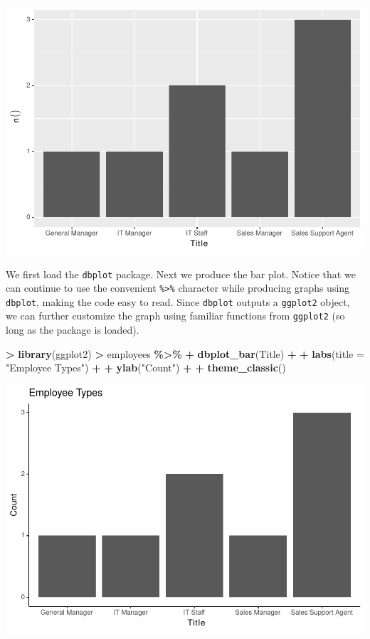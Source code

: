 \documentclass[
]{krantz}
\makeatletter
\newenvironment{Shaded}{\begin{snugshade}}{\end{snugshade}}
\newcommand{\DataTypeTok}[1]{\textcolor[rgb]{0.27,0.27,0.27}{#1}}
\newcommand{\KeywordTok}[1]{\textcolor[rgb]{0.27,0.27,0.27}{\textbf{#1}}}
\newcommand{\NormalTok}[1]{#1}
\newcommand{\OperatorTok}[1]{\textcolor[rgb]{0.43,0.43,0.43}{\textbf{#1}}}
\newcommand{\StringTok}[1]{\textcolor[rgb]{0.5,0.5,0.5}{#1}}
\newenvironment{kframe}{%
\medskip{}
\setlength{\fboxsep}{.8em}
 \def\at@end@of@kframe{}%
 \ifinner\ifhmode%
  \def\at@end@of@kframe{\end{minipage}}%
  \begin{minipage}{\columnwidth}%
 \fi\fi%
 \def\FrameCommand##1{\hskip\@totalleftmargin \hskip-\fboxsep
 \colorbox{shadecolor}{##1}\hskip-\fboxsep
     \hskip-\linewidth \hskip-\@totalleftmargin \hskip\columnwidth}%
 \MakeFramed {\advance\hsize-\width
   \@totalleftmargin\z@ \linewidth\hsize
   \@setminipage}}%
 {\par\unskip\endMakeFramed%
 \at@end@of@kframe}
\renewenvironment{Shaded}{\begin{kframe}}{\end{kframe}}
\makeatother
\begin{document}
\includegraphics{bookdown_files/figure-latex/unnamed-chunk-316-1.pdf}

We first load the \texttt{dbplot} package. Next we produce the bar plot. Notice that we can continue to use the convenient \texttt{\%\textgreater{}\%} character while producing graphs using \texttt{dbplot}, making the code easy to read. Since \texttt{dbplot} outputs a \texttt{ggplot2} object, we can further customize the graph using familiar functions from \texttt{ggplot2} (so long as the package is loaded).

\begin{Shaded}
\begin{Highlighting}[]
\OperatorTok{\textgreater{}}\StringTok{ }\KeywordTok{library}\NormalTok{(ggplot2)}
\OperatorTok{\textgreater{}}\StringTok{ }\NormalTok{employees }\OperatorTok{\%\textgreater{}\%}\StringTok{ }
\OperatorTok{+}\StringTok{   }\KeywordTok{dbplot\_bar}\NormalTok{(Title) }\OperatorTok{+}\StringTok{ }
\OperatorTok{+}\StringTok{   }\KeywordTok{labs}\NormalTok{(}\DataTypeTok{title =} \StringTok{"Employee Types"}\NormalTok{) }\OperatorTok{+}\StringTok{ }
\OperatorTok{+}\StringTok{   }\KeywordTok{ylab}\NormalTok{(}\StringTok{"Count"}\NormalTok{) }\OperatorTok{+}\StringTok{ }
\OperatorTok{+}\StringTok{   }\KeywordTok{theme\_classic}\NormalTok{()}
\end{Highlighting}
\end{Shaded}

\includegraphics{bookdown_files/figure-latex/unnamed-chunk-317-1.pdf}
\end{document}
